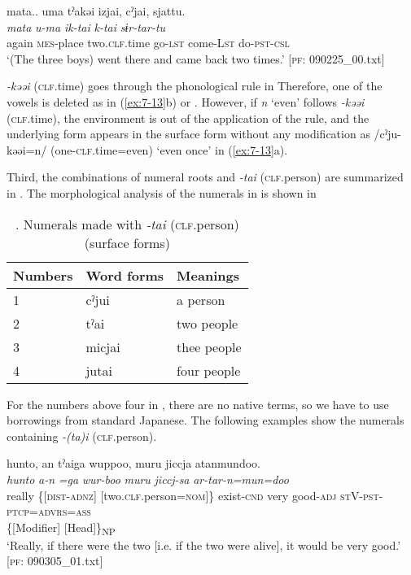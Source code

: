 \ex \label{ex:7:13b}{\TM}
\glll  mata..  uma  tˀakəi  izjai,  cˀjai,  sjattu.\\
\textit{mata}  \textit{u-ma}  \textit{}  \textit{ik-tai}  \textit{k-tai}  \textit{sɨr-tar-tu}\\
again  \textsc{mes}-place  two.\textsc{clf}.time  go-\textsc{lst}  come-L\textsc{st}  do-\textsc{pst}-\textsc{csl}\\
\glt ‘(The three boys) went there and came back two times.’ [\textsc{pf}: 090225\_00.txt]

\z
\z

\textit{{}-kəəi} (\textsc{clf}.time) goes through the phonological rule in  Therefore, one of the vowels is deleted as in (\ref{ex:7-13}b) or . However, if \textit{n} ‘even’ follows \textit{{}-kəəi} (\textsc{clf}.time), the environment is out of the application of the rule, and the underlying form appears in the surface form without any modification as /cˀju-kəəi=n/ (one-\textsc{clf}.time=even) ‘even once’ in (\ref{ex:7-13}a).

Third, the combinations of numeral roots and \textit{{}-tai} (\textsc{clf}.person) are summarized in . The morphological analysis of the numerals in  is shown in 

\begin{table}
\caption{\label{tab:key:49}. Numerals made with \textit{-tai} (\textsc{clf}.person) (surface forms)}
\begin{tabular}{lll}
\lsptoprule
Numbers  & Word forms  & Meanings\\
\midrule
1&  cˀjui & a person      \\
2&  tˀai  &two people     \\
3&  micjai&  thee people  \\
4&  jutai & four people   \\
\end{tabular}
\end{table}

For the numbers above four in , there are no native terms, so we have to use borrowings from standard Japanese. The following examples show the numerals containing \textit{{}-(ta)i} (\textsc{clf}.person).

\ea \label{ex:7:14}
\ea \label{ex:7:14a}
{\TM}
\gllll  hunto,  an  tˀaiga  wuppoo,  muru   jiccja  atanmundoo.\\
\textit{hunto}  \textit{a-n}  \textit{=ga}  \textit{wur-boo}  \textit{muru}  \textit{jiccj-sa}  \textit{ar-tar-n=mun=doo}\\
really  \{[\textsc{dist}-\textsc{adnz}]  [two.\textsc{clf}.person=\textsc{nom}]\}  exist-\textsc{cnd}  very   good-\textsc{adj}  \textsc{st}V-\textsc{pst}-\textsc{ptcp}=\textsc{advrs}=\textsc{ass}\\
\{[Modifier]  [Head]\}\textsubscript{NP}    \\
\glt ‘Really, if there were the two [i.e. if the two were alive], it would be very good.’ [\textsc{pf}: 090305\_01.txt]

